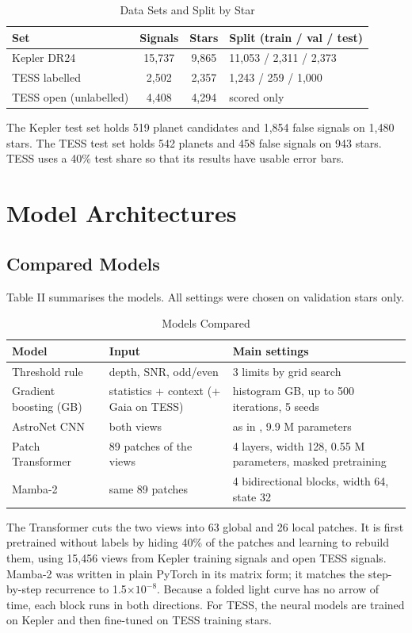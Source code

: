 \documentclass[conference,a4paper]{IEEEtran}
\begin{document}
\begin{table}[!ht]
\caption{Data Sets and Split by Star}
\centering\footnotesize\setlength{\tabcolsep}{4pt}
\begin{tabular}{lccl}
\hline
\textbf{Set} & \textbf{Signals} & \textbf{Stars} & \textbf{Split (train / val / test)} \\
\hline
Kepler DR24 & 15,737 & 9,865 & 11,053 / 2,311 / 2,373 \\
TESS labelled & 2,502 & 2,357 & 1,243 / 259 / 1,000 \\
TESS open (unlabelled) & 4,408 & 4,294 & scored only \\
\hline
\end{tabular}
\end{table}
The Kepler test set holds 519 planet candidates and 1,854 false signals on 1,480 stars. The TESS test set holds 542 planets and 458 false signals on 943 stars. TESS uses a 40\% test share so that its results have usable error bars.

\section{Model Architectures}
\subsection{Compared Models}
Table II summarises the models. All settings were chosen on validation stars only.

\begin{table}[!t]
\caption{Models Compared}
\centering\footnotesize\setlength{\tabcolsep}{4pt}
\begin{tabular}{lll}
\hline
\textbf{Model} & \textbf{Input} & \textbf{Main settings} \\
\hline
Threshold rule & depth, SNR, odd/even & 3 limits by grid search \\
Gradient boosting (GB) & statistics + context (+ Gaia on TESS) & histogram GB, up to 500 iterations, 5 seeds \\
AstroNet CNN & both views & as in \cite{r3}, 9.9 M parameters \\
Patch Transformer & 89 patches of the views & 4 layers, width 128, 0.55 M parameters, masked pretraining \\
Mamba-2 & same 89 patches & 4 bidirectional blocks, width 64, state 32 \\
\hline
\end{tabular}
\end{table}
The Transformer cuts the two views into 63 global and 26 local patches. It is first pretrained without labels by hiding 40\% of the patches and learning to rebuild them, using 15,456 views from Kepler training signals and open TESS signals. Mamba-2 was written in plain PyTorch in its matrix form; it matches the step-by-step recurrence to 1.5$\times10^{-8}$. Because a folded light curve has no arrow of time, each block runs in both directions. For TESS, the neural models are trained on Kepler and then fine-tuned on TESS training stars.
\end{document}
